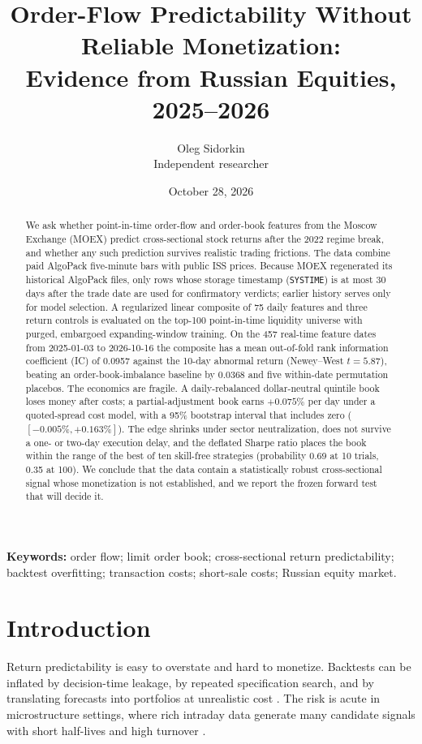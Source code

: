 \documentclass[11pt]{article}
\title{Order-Flow Predictability Without Reliable Monetization:\\Evidence from Russian Equities, 2025--2026}
\author{Oleg Sidorkin\\Independent researcher}
\date{October 28, 2026}
\begin{document}
\maketitle

\begin{abstract}
We ask whether point-in-time order-flow and order-book features from the Moscow Exchange (MOEX) predict cross-sectional stock returns after the 2022 regime break, and whether any such prediction survives realistic trading frictions. The data combine paid AlgoPack five-minute bars with public ISS prices. Because MOEX regenerated its historical AlgoPack files, only rows whose storage timestamp (\texttt{SYSTIME}) is at most 30 days after the trade date are used for confirmatory verdicts; earlier history serves only for model selection. A regularized linear composite of 75 daily features and three return controls is evaluated on the top-100 point-in-time liquidity universe with purged, embargoed expanding-window training. On the 457 real-time feature dates from 2025-01-03 to 2026-10-16 the composite has a mean out-of-fold rank information coefficient (IC) of 0.0957 against the 10-day abnormal return (Newey--West $t=5.87$), beating an order-book-imbalance baseline by 0.0368 and five within-date permutation placebos. The economics are fragile. A daily-rebalanced dollar-neutral quintile book loses money after costs; a partial-adjustment book earns $+0.075\%$ per day under a quoted-spread cost model, with a 95\% bootstrap interval that includes zero ($[-0.005\%,+0.163\%]$). The edge shrinks under sector neutralization, does not survive a one- or two-day execution delay, and the deflated Sharpe ratio places the book within the range of the best of ten skill-free strategies (probability 0.69 at 10 trials, 0.35 at 100). We conclude that the data contain a statistically robust cross-sectional signal whose monetization is not established, and we report the frozen forward test that will decide it.
\end{abstract}

\noindent\textbf{Keywords:} order flow; limit order book; cross-sectional return predictability; backtest overfitting; transaction costs; short-sale costs; Russian equity market.

\section{Introduction}

Return predictability is easy to overstate and hard to monetize. Backtests can be inflated by decision-time leakage, by repeated specification search, and by translating forecasts into portfolios at unrealistic cost \citep{zhang2026alpha,bailey2014deflated,chordia2017anomalies,khushi2026qfrs}. The risk is acute in microstructure settings, where rich intraday data generate many candidate signals with short half-lives and high turnover \citep{kolm2023deep,cont2023crossimpact,jensen2026implementable}.
\end{document}
